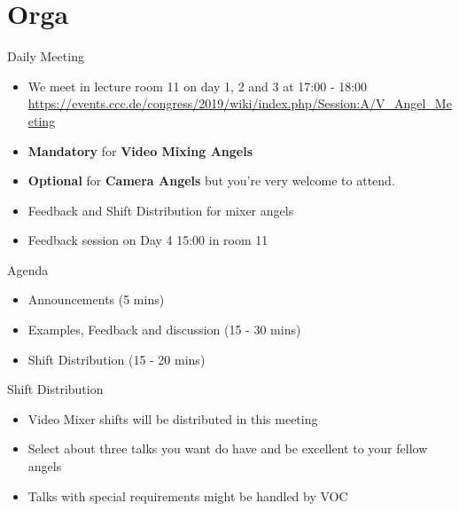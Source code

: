 \documentclass[aspectratio=169]{beamer}
\begin{document}
\section{Orga} 				%
\begin{frame}{Daily Meeting}
\begin{itemize}
	\item We meet in lecture room 11 on day 1, 2 and 3 at 17:00 - 18:00 \\
	\renewcommand\UrlFont{\color{blue}\sffamily\textbf}
	\url{https://events.ccc.de/congress/2019/wiki/index.php/Session:A/V_Angel_Meeting}
	\item  \textbf{Mandatory} for \textbf{Video Mixing Angels}
	\item  \textbf{Optional} for \textbf{Camera Angels} but you're very welcome to attend.
	\item  Feedback and Shift Distribution for mixer angels
	\item Feedback session on Day 4 15:00 in room 11
\end{itemize} 
\end{frame}


\begin{frame}{Agenda}		%
\begin{itemize}
	\item Announcements (5 mins)
	\item Examples, Feedback and discussion (15 - 30 mins)
	\item Shift Distribution (15 - 20 mins)
\end{itemize} 
\end{frame}

\begin{frame}{Shift Distribution}		%
\begin{itemize}
	\item Video Mixer shifts will be distributed in this meeting
	\item Select about three talks you want do have and be excellent to your fellow angels
	\item Talks with special requirements might be handled by VOC
\end{itemize} 
\end{frame}
\end{document}

